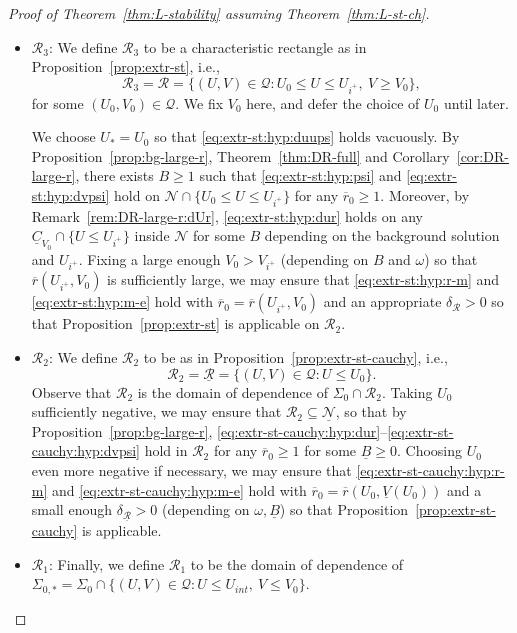 \documentclass[10pt, reqno]{amsart}
\theoremstyle{definition}
\theoremstyle{remark}
\theoremstyle{conjecture}
\numberwithin{equation}{section}
\newcommand{\set}[1]{\{#1\}}
\newcommand{\0}{\emptyset}
\newcommand{\dlt}{\delta}
\newcommand{\Sgm}{\Sigma}
\newcommand{\omg}{\omega}
\newcommand{\calN}{\mathcal N}
\newcommand{\calQ}{\mathcal Q}
\newcommand{\calR}{\mathcal R}
\newcommand{\PD}{\calQ}
\newcommand{\uC}{\underline{C}}
\newcommand{\rbg}{\overline{r}}					%
\begin{document}
\begin{proof}[Proof of Theorem~\ref{thm:L-stability} assuming Theorem~\ref{thm:L-st-ch}]
\begin{itemize}
\item $\calR_{3}$: We define $\calR_{3}$ to be a characteristic rectangle as in Proposition~\ref{prop:extr-st}, i.e.,
\begin{equation*}
	\calR_{3} = \calR = \set{(U, V) \in \PD : U_{0} \leq U \leq U_{i^{+}}, \ V \geq V_{0}},
\end{equation*}
for some $(U_{0}, V_{0}) \in \PD$. We fix $V_{0}$ here, and defer the choice of $U_{0}$ until later.

We choose $U_{\ast} = U_{0}$ so that \eqref{eq:extr-st:hyp:duups} holds vacuously. By Proposition~\ref{prop:bg-large-r}, Theorem~\ref{thm:DR-full} and Corollary~\ref{cor:DR-large-r}, there exists $B \geq 1$ such that \eqref{eq:extr-st:hyp:psi} and \eqref{eq:extr-st:hyp:dvpsi} hold on $\calN \cap \set{U_{0} \leq U \leq U_{i^{+}}}$ for any $\rbg_{0} \geq 1$. Moreover, by Remark~\ref{rem:DR-large-r:dUr}, \eqref{eq:extr-st:hyp:dur} holds on any $\uC_{V_{0}} \cap \set{U \leq U_{i^{+}}}$ inside $\calN$ for some $B$ depending on the background solution and $U_{i^{+}}$. Fixing a large enough $V_{0}> V_{i^{+}}$ (depending on $B$ and $\omg$) so that $\rbg(U_{i^{+}}, V_{0})$ is sufficiently large, we may ensure that \eqref{eq:extr-st:hyp:r-m} and \eqref{eq:extr-st:hyp:m-e} hold with $\rbg_{0} = \rbg(U_{i^{+}}, V_{0})$ and an appropriate $\dlt_{\calR} > 0$ so that Proposition~\ref{prop:extr-st} is applicable on $\calR_{2}$.

\item $\calR_{2}$: We define $\calR_{2}$ to be as in Proposition~\ref{prop:extr-st-cauchy}, i.e.,
\begin{equation*}
	\calR_{2} = \underline{\calR} = \set{(U, V) \in \PD : U \leq U_{0}}.
\end{equation*}
Observe that $\calR_{2}$ is the domain of dependence of $\Sgm_{0} \cap \calR_{2}$. Taking $U_{0}$ sufficiently negative, we may ensure that $\calR_{2} \subseteq \underline{\calN}$, so that by Proposition~\ref{prop:bg-large-r}, \eqref{eq:extr-st-cauchy:hyp:dur}--\eqref{eq:extr-st-cauchy:hyp:dvpsi} hold in $\calR_{2}$ for any $\rbg_{0} \geq 1$ for some $\underline{B} \geq 0$. Choosing $U_{0}$ even more negative if necessary, we may ensure that \eqref{eq:extr-st-cauchy:hyp:r-m} and \eqref{eq:extr-st-cauchy:hyp:m-e} hold with $\rbg_{0} = \rbg(U_{0}, \underline{V}(U_{0}))$ and a small enough $\dlt_{\underline{\calR}} > 0$ (depending on $\omg, \underline{B}$) so that Proposition~\ref{prop:extr-st-cauchy} is applicable.

\item $\calR_{1}$: Finally, we define $\calR_{1}$ to be the domain of dependence of $\Sgm_{0, \ast} = \Sgm_{0} \cap \set{(U, V) \in \PD : U \leq U_{int}, \ V \leq V_{0}}$. 
\end{itemize}


\end{proof}
\end{document}
